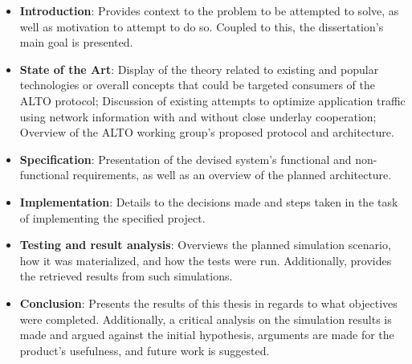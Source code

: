 \documentclass[
  oneside,
  11pt, a4paper,
  footinclude=true,
  headinclude=true,
  cleardoublepage=empty
]{scrbook}
\begin{document}
    \begin{itemize}
        \item \textbf{Introduction}: Provides context to the problem to be attempted to solve, as well as motivation to attempt to do so. Coupled to this, the dissertation's main goal is presented.
        \item \textbf{State of the Art}: Display of the theory related to existing and popular technologies or overall concepts that could be targeted consumers of the ALTO protocol; Discussion of existing attempts to optimize application traffic using network information with and without close underlay cooperation; Overview of the ALTO working group's proposed protocol and architecture.
        \item \textbf{Specification}: Presentation of the devised system's functional and non-functional requirements, as well as an overview of the planned architecture.
        \item \textbf{Implementation}: Details to the decisions made and steps taken in the task of implementing the specified project. 
        \item \textbf{Testing and result analysis}: Overviews the planned simulation scenario, how it was materialized, and how the tests were run. Additionally, provides the retrieved results from such simulations.
        \item \textbf{Conclusion}: Presents the results of this thesis in regards to what objectives were completed. Additionally, a critical analysis on the simulation results is made and argued against the initial hypothesis, arguments are made for the product's usefulness, and future work is suggested. 
    \end{itemize}{}

\end{document}
